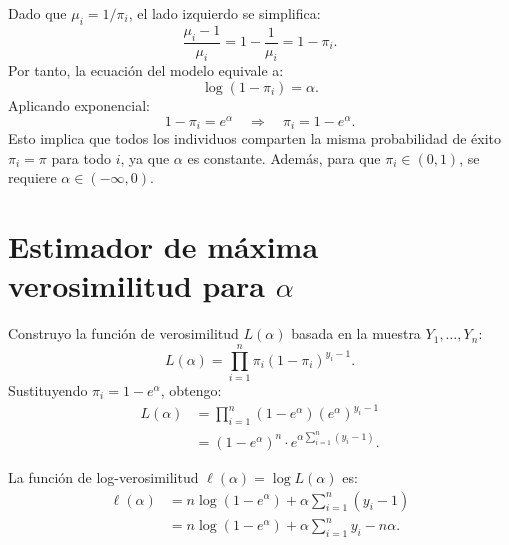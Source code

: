 \documentclass{article}
\begin{document}
Dado que $\mu_i = 1/\pi_i$, el lado izquierdo se simplifica:
\begin{equation}
\frac{\mu_i - 1}{\mu_i} = 1 - \frac{1}{\mu_i} = 1 - \pi_i.
\end{equation}
Por tanto, la ecuación del modelo equivale a:
\begin{equation}
\log(1-\pi_i) = \alpha.
\end{equation}
Aplicando exponencial:
\begin{equation}
1 - \pi_i = e^\alpha \quad \Longrightarrow \quad \pi_i = 1 - e^\alpha.
\end{equation}
Esto implica que todos los individuos comparten la misma probabilidad de éxito $\pi_i = \pi$ para todo $i$, ya que $\alpha$ es constante. Además, para que $\pi_i \in (0,1)$, se requiere $\alpha \in (-\infty, 0)$.

\section{Estimador de máxima verosimilitud para $\alpha$}

Construyo la función de verosimilitud $L(\alpha)$ basada en la muestra $Y_1,\ldots,Y_n$:
\begin{equation}
L(\alpha) = \prod_{i=1}^{n} \pi_i (1-\pi_i)^{y_i-1}.
\end{equation}
Sustituyendo $\pi_i = 1 - e^\alpha$, obtengo:
\begin{align}
L(\alpha) &= \prod_{i=1}^{n} (1 - e^\alpha) \left(e^\alpha\right)^{y_i-1} \\
          &= (1 - e^\alpha)^n \cdot e^{\alpha \sum_{i=1}^n (y_i - 1)}.
\end{align}

La función de log-verosimilitud $\ell(\alpha) = \log L(\alpha)$ es:
\begin{align}
\ell(\alpha) &= n\log(1 - e^\alpha) + \alpha \sum_{i=1}^n (y_i - 1) \\
             &= n\log(1 - e^\alpha) + \alpha \sum_{i=1}^n y_i - n\alpha.
\end{align}
\end{document}
